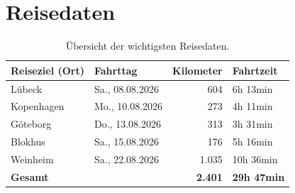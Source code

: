 \documentclass[a4paper,12pt]{article}
\begin{document}
\section{Reisedaten}

\begin{table}[H] %
\centering
\begin{tabular}{|l|l|r|l|}
\hline
\textbf{Reiseziel (Ort)} & \textbf{Fahrttag} & \textbf{Kilometer} & \textbf{Fahrtzeit} \\
\hline
Lübeck & Sa., 08.08.2026 & 604 & 6h 13min \\
Kopenhagen & Mo., 10.08.2026 & 273 & 4h 11min \\
Göteborg & Do., 13.08.2026 & 313 & 3h 31min \\
Blokhus & Sa., 15.08.2026 & 176 & 5h 16min \\
Weinheim & Sa., 22.08.2026 & 1.035 & 10h 36min \\
\hline
\textbf{Gesamt} & & \textbf{\mbox{2.401}} & \textbf{29h 47min} \\
\hline
\end{tabular}
\caption{Übersicht der wichtigsten Reisedaten.}
\label{tab:Reisedaten}
\end{table}
\end{document}
